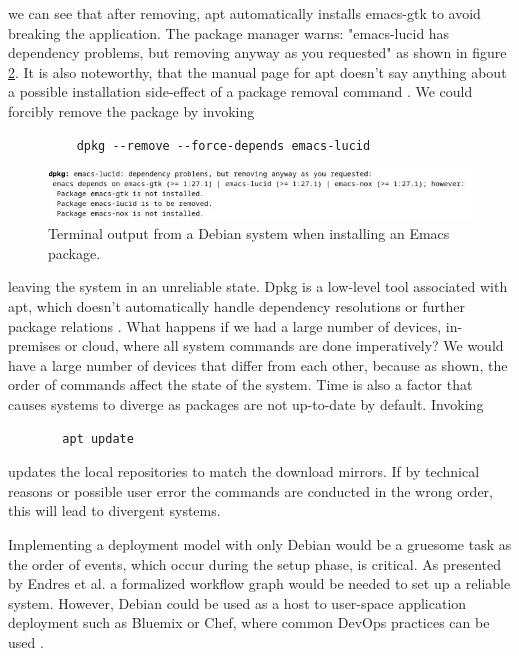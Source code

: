we can see that after removing, apt automatically installs emacs-gtk
to avoid breaking the application. The package manager warns:
"emacs-lucid has dependency problems, but removing anyway as you
requested" as shown in figure \ref{deb_remove}. It is also noteworthy,
that the manual page for apt doesn't say anything about a possible
installation side-effect of a package removal command
\cite{ubuntuUbuntuManpage}. We could forcibly remove the package by
invoking
\begin{figure}[H]\label{dpkgsnippet}
\begin{lstlisting} 
    dpkg --remove --force-depends emacs-lucid
\end{lstlisting}
\end{figure}
\begin{figure}\label{deb_remove}
\includegraphics[scale=2.0]{latex/kuvat/cropped_apt_output.jpg}
\caption{Terminal output from a Debian system when installing an Emacs package.}
\end{figure}
leaving the system in an unreliable state. Dpkg is a low-level
tool associated with apt, which doesn't automatically handle dependency
resolutions or further package relations
\cite{thiruvathukal2004gentoo}. What happens if we had a large number
of devices, in-premises or cloud, where all system commands are done
imperatively? We would have a large number of devices that differ from
each other, because as shown, the order of commands affect the state
of the system. Time is also a factor that
causes systems to diverge as packages are not up-to-date by
default. Invoking 
\begin{figure}[H]\label{aptupdate}
\begin{lstlisting} 
  apt update
\end{lstlisting}
\end{figure}
updates the local repositories to match the download mirrors. If by
technical reasons or possible user error the commands are conducted in
the wrong order, this will lead to divergent systems.

Implementing a deployment model with only Debian would be a gruesome
task as the order of events, which occur during the setup phase, is
critical. As presented by Endres et al. a formalized workflow graph
would be needed to set up a reliable system. However, Debian could
be used as a host to user-space application deployment such as
Bluemix or Chef, where common DevOps practices can be used
\cite{endres2017declarative}.


